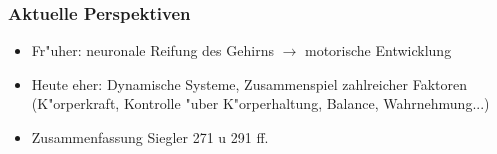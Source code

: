 \subsubsection{Aktuelle Perspektiven}
\begin{itemize}
	\item
		Fr"uher: neuronale Reifung des Gehirns $\rightarrow$ motorische Entwicklung
	\item
		Heute eher: Dynamische Systeme, Zusammenspiel zahlreicher Faktoren (K"orperkraft, Kontrolle "uber K"orperhaltung, Balance, Wahrnehmung...)
	\item
		Zusammenfassung Siegler 271 u 291 ff.
\end{itemize}
